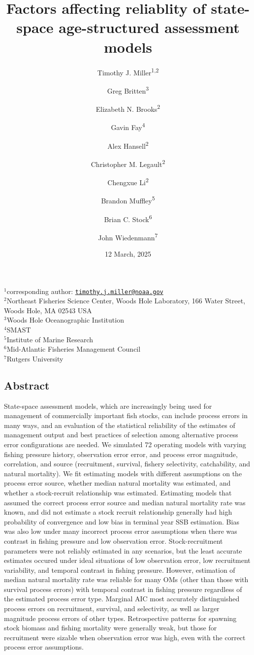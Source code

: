 \documentclass[
  12pt,
]{article}
\title{Factors affecting reliablity of state-space age-structured
assessment models}
\author{Timothy J. Miller\textsuperscript{1,2} \and Greg
Britten\textsuperscript{3} \and Elizabeth N.
Brooks\textsuperscript{2} \and Gavin Fay\textsuperscript{4} \and Alex
Hansell\textsuperscript{2} \and Christopher M.
Legault\textsuperscript{2} \and Chengxue
Li\textsuperscript{2} \and Brandon Muffley\textsuperscript{5} \and Brian
C. Stock\textsuperscript{6} \and John Wiedenmann\textsuperscript{7}}
\date{12 March, 2025}
\begin{document}
\maketitle

\(^1\)corresponding author:
\href{mailto:timothy.j.miller@noaa.gov}{\nolinkurl{timothy.j.miller@noaa.gov}}\\
\(^2\)Northeast Fisheries Science Center, Woods Hole Laboratory, 166
Water Street, Woods Hole, MA 02543 USA\\
\(^3\)Woods Hole Oceanographic Institution\\
\(^4\)SMAST\\
\(^5\)Institute of Marine Research\\
\(^6\)Mid-Atlantic Fisheries Management Council\\
\(^7\)Rutgers University\\

\pagebreak

\hypertarget{abstract}{%
\subsection*{Abstract}\label{abstract}}

State-space assessment models, which are increasingly being used for
management of commercially important fish stocks, can include process
errors in many ways, and an evaluation of the statistical reliability of
the estimates of management output and best practices of selection among
alternative process error configurations are needed. We simulated 72
operating models with varying fishing pressure history, observation
error error, and process error magnitude, correlation, and source
(recruitment, survival, fishery selectivity, catchability, and natural
mortality). We fit estimating models with different assumptions on the
process error source, whether median natural mortality was estimated,
and whether a stock-recruit relationship was estimated. Estimating
models that assumed the correct process error source and median natural
mortality rate was known, and did not estimate a stock recruit
relationship generally had high probability of convergence and low bias
in terminal year SSB estimation. Bias was also low under many incorrect
process error assumptions when there was contrast in fishing pressure
and low observation error. Stock-recruitment parameters were not
reliably estimated in any scenarios, but the least accurate estimates
occured under ideal situations of low observation error, low recruitment
variability, and temporal contrast in fishing pressure. However,
estimation of median natural mortality rate was reliable for many OMs
(other than those with survival process errors) with temporal contrast
in fishing pressure regardless of the estimated process error type.
Marginal AIC most accurately distinguished process errors on
recruitment, survival, and selectivity, as well as larger magnitude
process errors of other types. Retrospective patterns for spawning stock
biomass and fishing mortality were generally weak, but those for
recruitment were sizable when observation error was high, even with the
correct process error assumptions.
\end{document}
